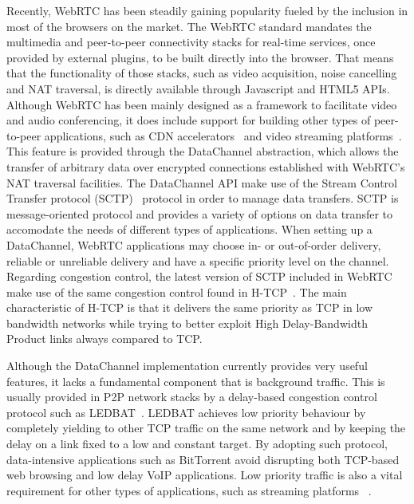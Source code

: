 \documentclass{sig-alternate}
\begin{document}

Recently, WebRTC has been steadily gaining popularity fueled by the inclusion in most of
the browsers on the market. The WebRTC standard mandates the multimedia and peer-to-peer
connectivity stacks for real-time services, once provided by external plugins, to be built
directly into the browser. That means that the functionality of those stacks, such as
video acquisition, noise cancelling and NAT traversal, is directly available through
Javascript and HTML5 APIs. Although WebRTC has been mainly designed as a framework to
facilitate video and audio conferencing, it does include support for building other types
of peer-to-peer applications, such as CDN accelerators~\cite{peerCDN} and video streaming
platforms~\cite{nurminen2013p2p}. This feature is provided through the DataChannel
abstraction, which allows the transfer of arbitrary data over encrypted connections
established with WebRTC's NAT traversal facilities. The DataChannel API make use of the
Stream Control Transfer protocol (SCTP)~\cite{sctp} protocol in order to manage data
transfers. SCTP is message-oriented protocol and provides a variety of options on data
transfer to accomodate the needs of different types of applications. When setting up a
DataChannel, WebRTC applications may choose in- or out-of-order delivery, reliable or
unreliable delivery and have a specific priority level on the channel. Regarding
congestion control, the latest version of SCTP included in WebRTC make use of the same
congestion control found in H-TCP~\cite{htcp}. The main characteristic of H-TCP is that it
delivers the same priority as TCP in low bandwidth networks while trying to better exploit
High Delay-Bandwidth Product links always compared to TCP.

Although the DataChannel implementation currently provides very useful features, it lacks
a fundamental component that is background traffic. This is usually provided in P2P
network stacks by a delay-based congestion control protocol such as LEDBAT~\cite{ledbat}. 
LEDBAT achieves low priority behaviour by completely yielding to other TCP traffic on the same
network and by keeping the delay on a link fixed to a low and constant target. By adopting
such protocol, data-intensive applications such as BitTorrent avoid disrupting both
TCP-based web browsing and low delay VoIP applications. Low priority traffic is also a
vital requirement for other types of applications, such as streaming
platforms ~\cite{smoothcache}\cite{roberto-thesis}.
\end{document}
